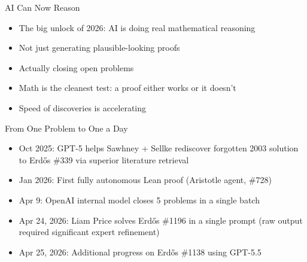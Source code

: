 \documentclass[aspectratio=169]{beamer}
\begin{document}

\begin{frame}{AI Can Now Reason}
    \begin{itemize}
        \item The big unlock of 2026: AI is doing real mathematical reasoning
        \vspace{0.3em}
        \item Not just generating plausible-looking proofs
        \vspace{0.3em}
        \item Actually closing open problems
        \vspace{0.3em}
        \item Math is the cleanest test: a proof either works or it doesn't
        \vspace{0.3em}
        \item Speed of discoveries is accelerating
    \end{itemize}
\end{frame}

\begin{frame}{From One Problem to One a Day}
    \begin{itemize}
        \item Oct 2025: GPT-5 helps Sawhney + Sellke rediscover forgotten 2003 solution to Erd\H{o}s \#339 via superior literature retrieval
        \vspace{0.3em}
        \item Jan 2026: First fully autonomous Lean proof (Aristotle agent, \#728)
        \vspace{0.3em}
        \item Apr 9: OpenAI internal model closes 5 problems in a single batch
        \vspace{0.3em}
        \item Apr 24, 2026: Liam Price solves Erd\H{o}s \#1196 in a single prompt (raw output required significant expert refinement)
        \vspace{0.3em}
        \item Apr 25, 2026: Additional progress on Erd\H{o}s \#1138 using GPT-5.5
    \end{itemize}
\end{frame}
\end{document}

